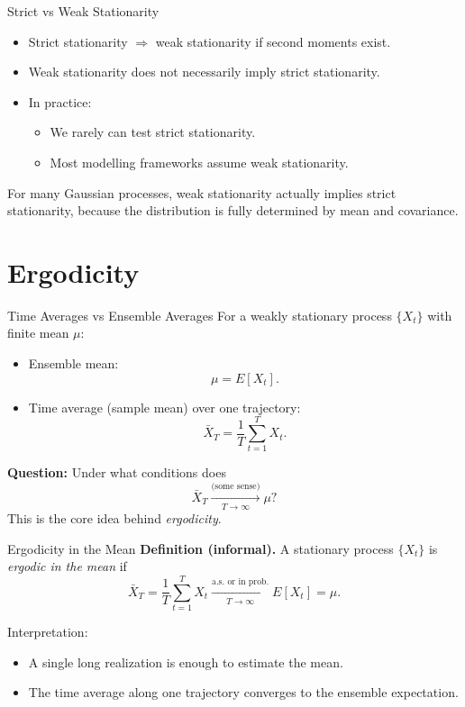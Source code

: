 \documentclass{beamer}
\begin{document}
\begin{frame}{Strict vs Weak Stationarity}
  \begin{itemize}
    \item Strict stationarity $\Rightarrow$ weak stationarity if second moments exist.
    \item Weak stationarity does not necessarily imply strict stationarity.
    \item In practice:
      \begin{itemize}
        \item We rarely can test strict stationarity.
        \item Most modelling frameworks assume weak stationarity.
      \end{itemize}
  \end{itemize}

  \vspace{0.3cm}
  For many Gaussian processes, weak stationarity actually implies strict stationarity, because the distribution is fully determined by mean and covariance.
\end{frame}

\section{Ergodicity}

\begin{frame}{Time Averages vs Ensemble Averages}
  For a weakly stationary process $\{X_t\}$ with finite mean $\mu$:
  \begin{itemize}
    \item Ensemble mean:
      \[
        \mu = E[X_t].
      \]
    \item Time average (sample mean) over one trajectory:
      \[
        \bar{X}_T = \frac{1}{T}\sum_{t=1}^T X_t.
      \]
  \end{itemize}

  \vspace{0.3cm}
  \textbf{Question:} Under what conditions does
  \[
    \bar{X}_T \xrightarrow[T \to \infty]{\text{(some sense)}} \mu?
  \]
  This is the core idea behind \emph{ergodicity}.
\end{frame}

\begin{frame}{Ergodicity in the Mean}
  \textbf{Definition (informal).}  
  A stationary process $\{X_t\}$ is \emph{ergodic in the mean} if
  \[
    \bar{X}_T = \frac{1}{T}\sum_{t=1}^T X_t
    \xrightarrow[T \to \infty]{\text{a.s. or in prob.}}
    E[X_t] = \mu.
  \]

  \vspace{0.3cm}
  Interpretation:
  \begin{itemize}
    \item A single long realization is enough to estimate the mean.
    \item The time average along one trajectory converges to the ensemble expectation.
  \end{itemize}
\end{frame}
\end{document}
